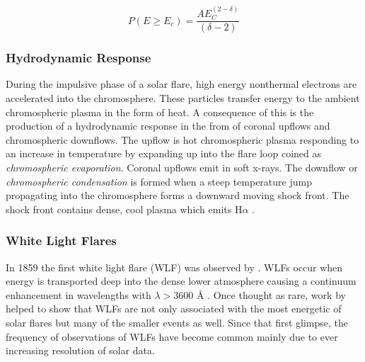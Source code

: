 \begin{equation}\label{pnth1}
P(E \geq E_{c}) = \frac{AE_{C}^{(2-\delta)}}{(\delta - 2)}
\end{equation}

\subsubsection{Hydrodynamic Response}
During the impulsive phase of a solar flare, high energy nonthermal electrons are accelerated into the chromosphere. These particles transfer energy to the ambient chromospheric plasma in the form of heat. A consequence of this is the production of a hydrodynamic response in the from of coronal upflows and chromospheric downflows. The upflow is hot chromospheric plasma responding to an increase in temperature by expanding up into the flare loop coined as \emph{chromospheric evaporation}. Coronal upflows emit in soft x-rays. The downflow or \emph{chromospheric condensation} is formed when a steep temperature jump propagating into the chromosphere forms a downward moving shock front. The shock front contains dense, cool plasma which emits H$\alpha$ \citep{1981SoPh...73..269L, 1990ApJ...348..333C, 2015SoPh..tmp...61K}. 



\subsubsection{White Light Flares}\label{wlf}
In 1859 the first white light flare (WLF) was observed by \cite{1859MNRAS..20...13C}. 
WLFs occur when energy is transported deep into the dense lower atmosphere causing a continuum enhancement in wavelengths with $\lambda > 3600$ Å \citep{1983SoPh...88..275N}. 
Once thought as rare, work by \cite{2003A&A...409.1107M} helped to show that WLFs are not only associated with the most energetic of solar flares but many of the smaller events as well. Since that first glimpse, the frequency of observations of WLFs have become common mainly due to ever increasing resolution of solar data. 


